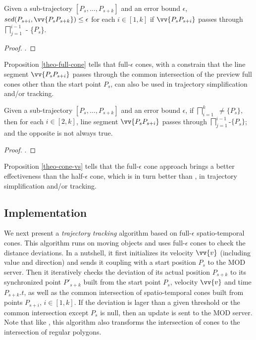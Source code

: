 \begin{proposition}
	\label{theo-full-cone}
	Given a sub-trajectory $[P_s,...,P_{s+k}]$ and an error bound $\epsilon$, $sed(P_{s+i}, \vv{P_sP_{s+k}})\le \epsilon$ for each $i \in [1,k]$ if $\vv{P_sP_{s+i}}$ passes through $\bigsqcap_{j=1}^{i-1}$ - \{$P_s$\}.
\end{proposition}

\begin{proof}
	\todo.
\end{proof}

Proposition \ref{theo-full-cone} tells that full-$\epsilon$ cones, with a constrain that the line segment $\vv{P_sP_{s+i}}$ passes through the common intersection of the preview full cones other than the start point $P_s$, can also be used in trajectory simplification and/or tracking. 

\begin{proposition}
	\label{theo-cone-vs}
	Given a sub-trajectory $[P_s,...,P_{s+k}]$ and an error bound $\epsilon$, if $\bigsqcap_{i=1}^{k}$ $\ne \{P_s\}$, then for each $i \in [2, k]$, line segment $\vv{P_sP_{s+i}}$ passes through $\bigsqcap_{j=1}^{i-1}$-$\{P_s\}$; and the opposite is not always true.
\end{proposition}

\begin{proof}
	\todo.
\end{proof}

Proposition \ref{theo-cone-vs} tells that the full-$\epsilon$ cone approach brings a better effectiveness than the half-$\epsilon$ cone, which is in turn better than \ldrh, in trajectory simplification and/or tracking.

\subsection{Implementation}

We next present a {\em trajectory tracking} algorithm based on full-$\epsilon$ spatio-temporal cones. This algorithm runs on moving objects and uses full-$\epsilon$ cones to check the distance deviations. In a nutshell, it first initializes its velocity $\vv{v}$ (including value and direction) and sends it coupling with a start position $P_s$ to the MOD server. Then it iteratively checks the deviation of its actual position $P_{s+k}$ to its synchronized point $P'_{s+k}$ built from the start point $P_s$, velocity $\vv{v}$ and time $P_{s+k}.t$, as well as the common intersection of spatio-temporal cones built from points $P_{s+i}$, $i \in [1, k]$. If the deviation is lager than a given threshold or the common intersection except $P_s$ is null, then an update is sent to the MOD server. Note that like \cised, this algorithm also transforms the intersection of cones to the intersection of regular polygons.


